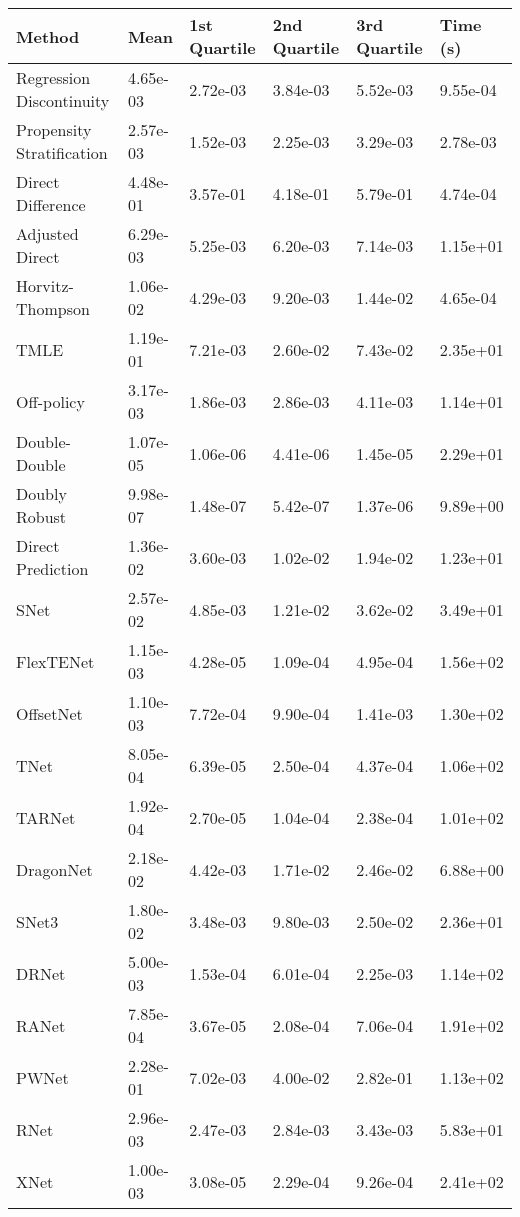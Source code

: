\begin{tabular}{llllll}
  \toprule
  \textbf{Method} & \textbf{Mean} & \textbf{1st Quartile} & \textbf{2nd Quartile} & \textbf{3rd Quartile} & \textbf{Time (s)} \\ \midrule 
Regression Discontinuity & 4.65e-03 & 2.72e-03 & 3.84e-03 & 5.52e-03 & \cellcolor{bronze!30}9.55e-04\\
Propensity Stratification & 2.57e-03 & 1.52e-03 & 2.25e-03 & 3.29e-03 & 2.78e-03\\
Direct Difference & 4.48e-01 & 3.57e-01 & 4.18e-01 & 5.79e-01 & \cellcolor{silver!30}4.74e-04\\
Adjusted Direct & 6.29e-03 & 5.25e-03 & 6.20e-03 & 7.14e-03 & 1.15e+01\\
Horvitz-Thompson & 1.06e-02 & 4.29e-03 & 9.20e-03 & 1.44e-02 & \cellcolor{gold!30}4.65e-04\\
TMLE & 1.19e-01 & 7.21e-03 & 2.60e-02 & 7.43e-02 & 2.35e+01\\
Off-policy & 3.17e-03 & 1.86e-03 & 2.86e-03 & 4.11e-03 & 1.14e+01\\
Double-Double & \cellcolor{silver!30}1.07e-05 & \cellcolor{silver!30}1.06e-06 & \cellcolor{silver!30}4.41e-06 & \cellcolor{silver!30}1.45e-05 & 2.29e+01\\
Doubly Robust & \cellcolor{gold!30}9.98e-07 & \cellcolor{gold!30}1.48e-07 & \cellcolor{gold!30}5.42e-07 & \cellcolor{gold!30}1.37e-06 & 9.89e+00\\
Direct Prediction & 1.36e-02 & 3.60e-03 & 1.02e-02 & 1.94e-02 & 1.23e+01\\
SNet & 2.57e-02 & 4.85e-03 & 1.21e-02 & 3.62e-02 & 3.49e+01\\
FlexTENet & 1.15e-03 & 4.28e-05 & 1.09e-04 & 4.95e-04 & 1.56e+02\\
OffsetNet & 1.10e-03 & 7.72e-04 & 9.90e-04 & 1.41e-03 & 1.30e+02\\
TNet & 8.05e-04 & 6.39e-05 & 2.50e-04 & 4.37e-04 & 1.06e+02\\
TARNet & \cellcolor{bronze!30}1.92e-04 & \cellcolor{bronze!30}2.70e-05 & \cellcolor{bronze!30}1.04e-04 & \cellcolor{bronze!30}2.38e-04 & 1.01e+02\\
DragonNet & 2.18e-02 & 4.42e-03 & 1.71e-02 & 2.46e-02 & 6.88e+00\\
SNet3 & 1.80e-02 & 3.48e-03 & 9.80e-03 & 2.50e-02 & 2.36e+01\\
DRNet & 5.00e-03 & 1.53e-04 & 6.01e-04 & 2.25e-03 & 1.14e+02\\
RANet & 7.85e-04 & 3.67e-05 & 2.08e-04 & 7.06e-04 & 1.91e+02\\
PWNet & 2.28e-01 & 7.02e-03 & 4.00e-02 & 2.82e-01 & 1.13e+02\\
RNet & 2.96e-03 & 2.47e-03 & 2.84e-03 & 3.43e-03 & 5.83e+01\\
XNet & 1.00e-03 & 3.08e-05 & 2.29e-04 & 9.26e-04 & 2.41e+02\\
\bottomrule
\end{tabular}